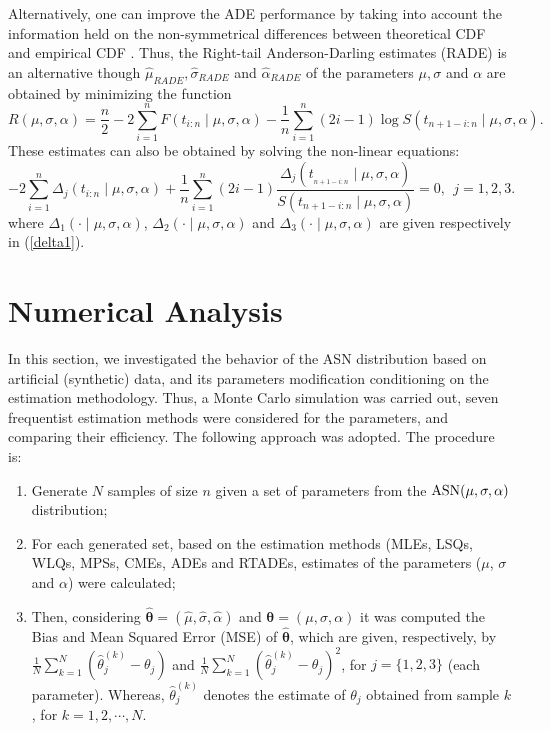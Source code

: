 \documentclass[]{interact}
\theoremstyle{plain}%
\theoremstyle{definition}
\theoremstyle{remark}
\begin{document}
Alternatively, one can improve the ADE performance by taking into account the information held on the non-symmetrical differences between theoretical CDF and empirical CDF \cite{ye2017unilateral}. Thus, the Right-tail Anderson-Darling estimates (RADE) is an alternative though $\widehat{\mu }_{RADE}, \widehat{\sigma }_{RADE}$ and $\widehat{\alpha}_{RADE}$ of the parameters $\mu, \sigma$ and $\alpha$ are obtained by minimizing the function
\begin{equation}
R(\mu,\sigma,\alpha) =\frac{n}{2}-2\sum_{i=1}^{n}F\left( t_{i:n}\mid \mu,\sigma,\alpha \right) -\frac{1}{n}\sum_{i=1}^{n}\left( 2i-1\right) \log
S\left( t_{n+1-i:n}\mid \mu,\sigma,\alpha \right).
\end{equation}
These estimates can also be obtained by solving the non-linear
equations:
\begin{equation*}
- 2 \sum_{i=1}^{n} \Delta_{j}\left( t_{i:n}\mid \mu,\sigma,\alpha \right) +\frac{1}{n} \sum_{i=1}^{n}\left( 2i-1\right) \frac{\Delta_{j}\left( t_{_{n+1-i:n}}\mid \mu,\sigma,\alpha \right) }{S%
\left( t_{n+1-i:n}\mid \mu,\sigma,\alpha \right) } =0, \ \ j=1,2,3. 
\end{equation*}%
where $\Delta _{1}\left( \cdot \mid \mu,\sigma,\alpha \right)$, $\Delta _{2}\left( \cdot \mid \mu,\sigma,\alpha \right) $ and
$\Delta
_{3}\left( \cdot \mid \mu,\sigma,\alpha \right) $ are given respectively in (\ref{delta1}).\\



\section{Numerical Analysis}\label{simul}

In this section, we investigated the behavior of the ASN distribution based on artificial (synthetic) data, and its parameters modification conditioning on the estimation methodology. Thus, a Monte Carlo simulation was carried out, seven frequentist estimation methods were considered for the parameters, and comparing their efficiency. The following approach was adopted. The procedure is:
\begin{enumerate}
\item Generate $N$ samples of size $n$ given a set of parameters from the ${\rm ASN}(\mu, \sigma, \alpha)$ distribution;
\item For each generated set, based on the estimation methods (MLEs, LSQs, WLQs, MPSs, CMEs, ADEs and RTADEs, estimates of the parameters ($\mu$, $\sigma$ and $\alpha$) were calculated;
\item Then, considering $\boldsymbol{\hat\theta}=\left(\hat\mu,\hat\sigma,\hat\alpha\right)$ and $\boldsymbol{\theta}=\left(\mu,\sigma,\alpha\right)$ it was computed the Bias and Mean Squared Error (MSE) of $\boldsymbol{\hat\theta}$, which are given, respectively, by $\frac{1}{N}\sum_{k=1}^{N} \left(\hat{\theta}_{j}^{(k)}-\theta_{j}\right)$ and $\frac{1}{N}\sum_{k=1}^{N} \left(\hat{\theta}_{j}^{(k)}-\theta_{j}\right)^2$, for $j=\{ 1,2,3\}$ (each parameter). Whereas, $\hat\theta_{j}^{(k)}$ denotes the estimate of $\theta_j$ obtained from sample $k$, for $k=1,2,\cdots,N$.
\end{enumerate}
\end{document}
